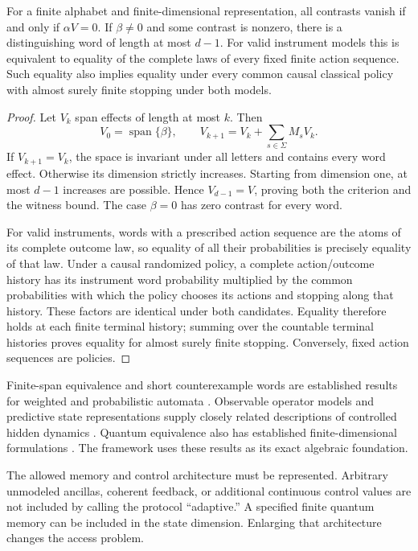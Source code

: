 \begin{theorem}\label{finite:span}
For a finite alphabet and finite-dimensional representation, all contrasts
vanish if and only if $\alpha V=0$. If $\beta\ne0$ and some contrast is
nonzero, there is a distinguishing word of length at most $d-1$.
For valid instrument models this is equivalent to equality of the complete
laws of every fixed finite action sequence. Such equality also implies
equality under every common causal classical policy with almost surely
finite stopping under both models.
\end{theorem}
\begin{proof}
Let $V_k$ span effects of length at most $k$. Then
\begin{equation}
 V_0=\operatorname{span}\{\beta\},\qquad
 V_{k+1}=V_k+\sum_{s\in\Sigma}M_sV_k.
\end{equation}
If $V_{k+1}=V_k$, the space is invariant under all letters and contains
every word effect. Otherwise its dimension strictly increases. Starting
from dimension one, at most $d-1$ increases are possible. Hence
$V_{d-1}=V$, proving both the criterion and the witness bound. The case
$\beta=0$ has zero contrast for every word.

For valid instruments, words with a prescribed action sequence are the
atoms of its complete outcome law, so equality of all their probabilities
is precisely equality of that law. Under a causal randomized policy, a
complete action/outcome history has its instrument word probability
multiplied by the common probabilities with which the policy chooses its
actions and stopping along that history. These factors are identical under
both candidates. Equality therefore holds at each finite terminal history;
summing over the countable terminal histories proves equality for almost
surely finite stopping. Conversely, fixed action sequences are policies.
\end{proof}

Finite-span equivalence and short counterexample words are established
results for weighted and probabilistic automata
\cite{f_tzeng,f_kiefer,f_notes}. Observable operator models and predictive
state representations supply closely related descriptions of controlled
hidden dynamics \cite{f_thon,f_jaeger,f_littman}. Quantum equivalence also
has established finite-dimensional formulations \cite{f_wang}. The
framework uses these results as its exact algebraic foundation.

The allowed memory and control architecture must be represented. Arbitrary
unmodeled ancillas, coherent feedback, or additional continuous control
values are not included by calling the protocol ``adaptive.'' A specified
finite quantum memory can be included in the state dimension. Enlarging
that architecture changes the access problem.

